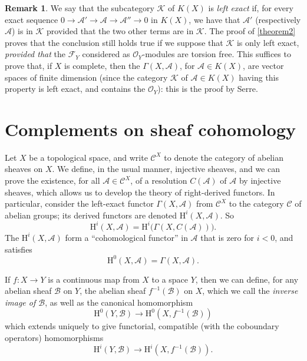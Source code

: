 \documentclass{article}
\theoremstyle{plain}
\theoremstyle{definition}
\newtheorem*{remark}{Remark}
\newcommand{\sh}{\mathscr}
\newcommand{\cat}{\mathcal}
\newcommand{\HH}{\mathrm{H}}
\newcommand{\oldpage}[1]{\marginpar{\footnotesize$\Big\vert$ \textit{p.~#1}}}
\begin{document}
\begin{remark}
  We say that the subcategory $\cat{K}$ of $K(X)$ is \emph{left exact} if, for every exact sequence $0\to\sh{A}'\to\sh{A}\to\sh{A}''\to0$ in $K(X)$, we have that $\sh{A}'$ (respectively $\sh{A}$) is in $\cat{K}$ provided that the two other terms are in $\cat{K}$.
  The proof of \cref{theorem2} proves that the conclusion still holds true if we suppose that $\cat{K}$ is only left exact, \emph{provided that} the $\sh{F}_Y$ considered as $\sh{O}_Y$-modules are torsion free.
  This suffices to prove that, if $X$ is complete, then the $\Gamma(X,\sh{A})$, for $\sh{A}\in K(X)$, are vector spaces of finite dimension (since the category $\cat{K}$ of $\sh{A}\in K(X)$ having this property is left exact, and contains the $\sh{O}_Y$): this is the proof by Serre.
\end{remark}


\section{Complements on sheaf cohomology}
\label{section3}

Let $X$ be a topological space, and write $\cat{C}^X$ to denote the category of abelian sheaves on $X$.
We define, in the usual manner, injective sheaves, and we can prove the existence, for all $\sh{A}\in\cat{C}^X$, of a resolution $C(\sh{A})$ of $\sh{A}$ by injective sheaves, which allows us to develop the theory of right-derived functors.
In particular, consider the left-exact functor $\Gamma(X,\sh{A})$
\oldpage{2-05}
from $\cat{C}^X$ to the category $\cat{C}$ of abelian groups;
its derived functors are denoted $\HH^i(X,\sh{A})$.
So
\[
  \HH^i(X,\sh{A}) = \HH^i\big(\Gamma(X,C(\sh{A}))\big).
\]
The $\HH^i(X,\sh{A})$ form a ``cohomological functor'' in $\sh{A}$ that is zero for $i<0$, and satisfies
\[
  \HH^0(X,\sh{A}) = \Gamma(X,\sh{A}).
\]

If $f\colon X\to Y$ is a continuous map from $X$ to a space $Y$, then we can define, for any abelian sheaf $\sh{B}$ on $Y$, the abelian sheaf $f^{-1}(\sh{B})$ on $X$, which we call the \emph{inverse image of $\sh{B}$}, as well as the canonical homomorphism
\[
  \HH^0(Y,\sh{B}) \to \HH^0(X,f^{-1}(\sh{B}))
\]
which extends uniquely to give functorial, compatible (with the coboundary operators) homomorphisms
\[
  \HH^i(Y,\sh{B}) \to \HH^i(X,f^{-1}(\sh{B})).
\]
\end{document}

